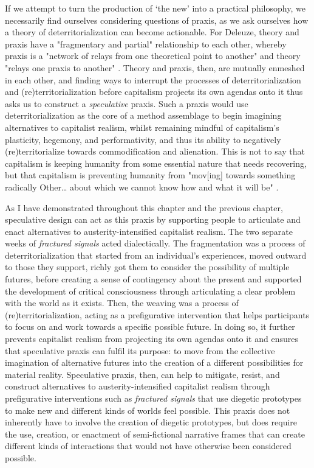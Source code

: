If we attempt to turn the production of ‘the new' into a practical philosophy, we necessarily find ourselves considering questions of praxis, as we ask ourselves how a theory of deterritorialization can become actionable. For Deleuze, theory and praxis have a "fragmentary and partial" relationship to each other, whereby praxis is a "network of relays from one theoretical point to another" and theory "relays one praxis to another" \citep[p. 206]{deleuze_desert_2004}. Theory and praxis, then, are mutually enmeshed in each other, and finding ways to interrupt the processes of deterritorialization and (re)territorialization before capitalism projects its own agendas onto it thus asks us to construct a \textit{speculative} praxis. Such a praxis would use deterritorialization as the core of a method assemblage \citep{law_after_2004, coleman_introduction_2013, wilkie_speculative_2015} to begin imagining alternatives to capitalist realism, whilst remaining mindful of capitalism’s plasticity, hegemony, and performativity, and thus its ability to negatively (re)territorialize towards commodification and alienation. This is not to say that capitalism is keeping humanity from some essential nature that needs recovering, but that capitalism is preventing humanity from "mov[ing] towards something radically Other… about which we cannot know how and what it will be" \citep[p. 121]{foucault_remarks_1991}. 

As I have demonstrated throughout this chapter and the previous chapter, speculative design can act as this praxis by supporting people to articulate and enact alternatives to austerity-intensified capitalist realism. The two separate weeks of \textit{fractured signals} acted dialectically. The fragmentation was a process of deterritorialization that started from an individual's experiences, moved outward to those they support, richly got them to consider the possibility of multiple futures, before creating a sense of contingency about the present and supported the development of critical consciousness through articulating a clear problem with the world as it exists. Then, the weaving was a process of (re)territorialization, acting as a prefigurative intervention that helps participants to focus on and work towards a specific possible future. In doing so, it further prevents capitalist realism from projecting its own agendas onto it and ensures that speculative praxis can fulfil its purpose: to move from the collective imagination of alternative futures into the creation of a different possibilities for material reality. Speculative praxis, then, can help to mitigate, resist, and construct alternatives to austerity-intensified capitalist realism through prefigurative interventions such as \textit{fractured signals} that use diegetic prototypes to make new and different kinds of worlds feel possible. This praxis does not inherently have to involve the creation of diegetic prototypes, but does require the use, creation, or enactment of semi-fictional narrative frames that can create different kinds of interactions that would not have otherwise been considered possible. 

